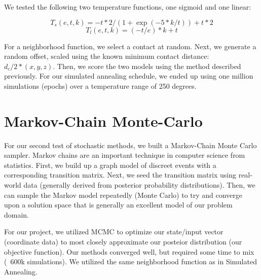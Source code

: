 \documentclass{article}
\begin{document}
We tested the following two temperature functions, one sigmoid and one linear:

\begin{equation}
      T_s(e,t,k) =  -t*2/(1 + \exp(-5*k/t)) + t*2
    \end{equation}
\begin{equation}
      T_l(e,t,k) =  (-t/e)*k + t
    \end{equation}
    
For a neighborhood function, we select a contact at random.  Next, we generate a random offset, scaled using the known minimum contact distance: $d_{c}/2*(x,y,z)$.  Then, we score the two models using the method described previously.  For our simulated annealing schedule, we ended up using one million simulations (epochs) over a temperature range of 250 degrees.

\section{Markov-Chain Monte-Carlo}

For our second test of stochastic methods, we built a Markov-Chain Monte Carlo sampler.  Markov chains are an important technique in computer science from statistics.  First, we build up a graph model of discreet events with a corresponding transition matrix.  Next, we seed the transition matrix using real-world data (generally derived from posterior probability distributions).  Then, we can sample the Markov model repeatedly (Monte Carlo) to try and converge upon a solution space that is generally an excellent model of our problem domain.

For our project, we utilized MCMC to optimize our state/input vector (coordinate data) to most closely approximate our posteior distribution (our objective function).  Our methods converged well, but required some time to mix (~600k simulations).  We utilized the same neighborhood function as in Simulated Annealing.
\end{document}
